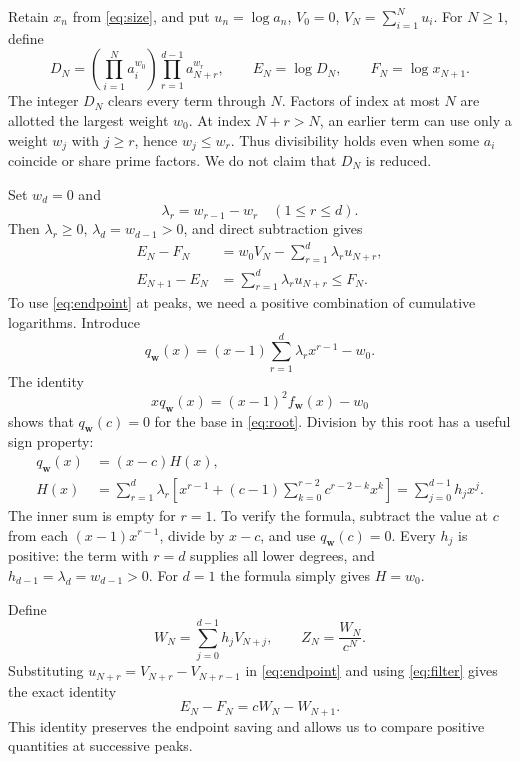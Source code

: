\documentclass[11pt]{article}
\numberwithin{equation}{section}
\newcommand{\bw}{\mathbf w}
\begin{document}
Retain $x_n$ from \eqref{eq:size}, and put $u_n=\log a_n$, $V_0=0$,
$V_N=\sum_{i=1}^N u_i$. For $N\ge1$, define
\begin{equation}\label{eq:clearer}
  D_N=\left(\prod_{i=1}^{N}a_i^{w_0}\right)
          \prod_{r=1}^{d-1}a_{N+r}^{w_r},\qquad
  E_N=\log D_N,\qquad F_N=\log x_{N+1}.
\end{equation}
The integer $D_N$ clears every term through $N$. Factors of index at
most $N$ are allotted the largest weight $w_0$. At index $N+r>N$,
an earlier term can use only a weight $w_j$ with $j\ge r$, hence
$w_j\le w_r$. Thus divisibility holds even when some $a_i$ coincide
or share prime factors. We do not claim that $D_N$ is reduced.

Set $w_d=0$ and
\[
  \lambda_r=w_{r-1}-w_r\quad(1\le r\le d).
\]
Then $\lambda_r\ge0$, $\lambda_d=w_{d-1}>0$, and direct subtraction
gives
\begin{align}
  E_N-F_N&=w_0V_N-\sum_{r=1}^d\lambda_r u_{N+r},
       \label{eq:endpoint}\\
  E_{N+1}-E_N&=\sum_{r=1}^d\lambda_r u_{N+r}\le F_N.
       \label{eq:increment}
\end{align}
To use \eqref{eq:endpoint} at peaks, we need a positive combination
of cumulative logarithms. Introduce
\[
  q_{\bw}(x)=(x-1)\sum_{r=1}^d\lambda_r x^{r-1}-w_0.
\]
The identity
\begin{equation}\label{eq:rootidentity}
  xq_{\bw}(x)=(x-1)^2f_{\bw}(x)-w_0
\end{equation}
shows that $q_{\bw}(c)=0$ for the base in \eqref{eq:root}.
Division by this root has a useful sign property:
\begin{equation}\label{eq:filter}
\begin{split}
  q_{\bw}(x)&=(x-c)H(x),\\
  H(x)&=\sum_{r=1}^d\lambda_r\left[
    x^{r-1}+(c-1)\sum_{k=0}^{r-2}c^{r-2-k}x^k\right]
       =\sum_{j=0}^{d-1}h_jx^j.
\end{split}
\end{equation}
The inner sum is empty for $r=1$. To verify the formula, subtract
the value at $c$ from each $(x-1)x^{r-1}$, divide by $x-c$, and use
$q_{\bw}(c)=0$. Every $h_j$ is positive: the term with $r=d$ supplies
all lower degrees, and $h_{d-1}=\lambda_d=w_{d-1}>0$.
For $d=1$ the formula simply gives $H=w_0$.

Define
\begin{equation}\label{eq:WZ}
  W_N=\sum_{j=0}^{d-1}h_jV_{N+j},\qquad Z_N=\frac{W_N}{c^N}.
\end{equation}
Substituting $u_{N+r}=V_{N+r}-V_{N+r-1}$ in
\eqref{eq:endpoint} and using \eqref{eq:filter} gives the exact identity
\begin{equation}\label{eq:positive}
  E_N-F_N=cW_N-W_{N+1}.
\end{equation}
This identity preserves the endpoint saving and allows us to compare
positive quantities at successive peaks.
\end{document}
